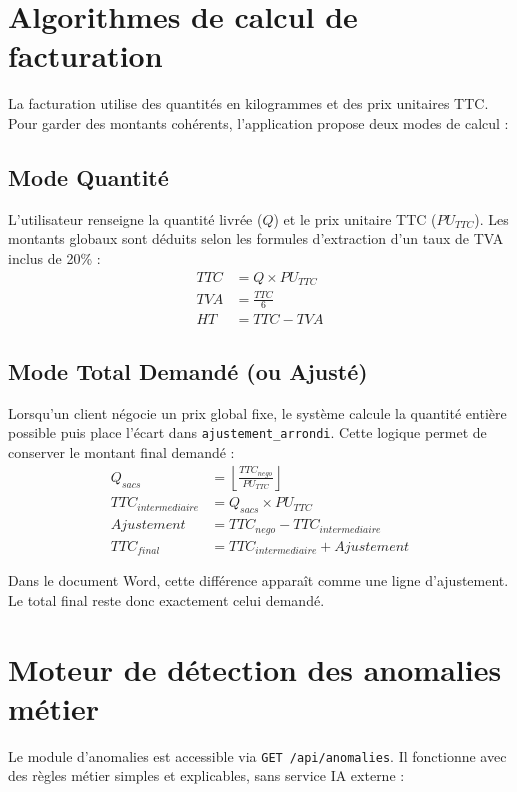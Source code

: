 \documentclass[12pt,a4paper,oneside]{report}
\newcommand{\code}[1]{\texttt{#1}}
\begin{document}
\section{Algorithmes de calcul de facturation}
La facturation utilise des quantités en kilogrammes et des prix unitaires TTC. Pour garder des montants cohérents, l'application propose deux modes de calcul :

\subsection{Mode Quantité}
L'utilisateur renseigne la quantité livrée (\(Q\)) et le prix unitaire TTC (\(PU_{TTC}\)). Les montants globaux sont déduits selon les formules d'extraction d'un taux de TVA inclus de 20\% :
\begin{align}
TTC &= Q \times PU_{TTC} \\
TVA &= \frac{TTC}{6} \\
HT &= TTC - TVA
\end{align}

\subsection{Mode Total Demandé (ou Ajusté)}
Lorsqu'un client négocie un prix global fixe, le système calcule la quantité entière possible puis place l'écart dans \code{ajustement\_arrondi}. Cette logique permet de conserver le montant final demandé :
\begin{align}
Q_{sacs} &= \left\lfloor \frac{TTC_{nego}}{PU_{TTC}} \right\rfloor \\
TTC_{intermediaire} &= Q_{sacs} \times PU_{TTC} \\
Ajustement &= TTC_{nego} - TTC_{intermediaire} \\
TTC_{final} &= TTC_{intermediaire} + Ajustement
\end{align}

Dans le document Word, cette différence apparaît comme une ligne d'ajustement. Le total final reste donc exactement celui demandé.

\section{Moteur de détection des anomalies métier}
Le module d'anomalies est accessible via \code{GET /api/anomalies}. Il fonctionne avec des règles métier simples et explicables, sans service IA externe :
\end{document}
